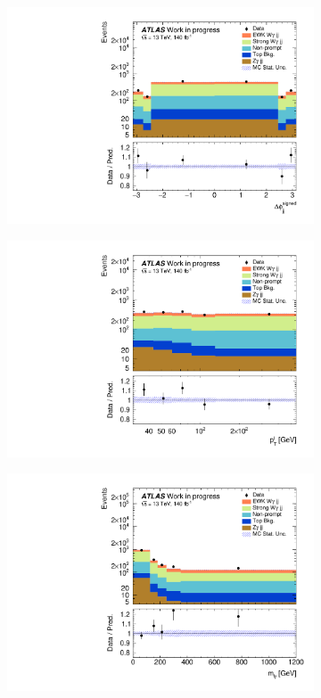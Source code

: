 \begin{figure}[htpb]
\begin{subfigure}[b]{0.48\textwidth}
    \includegraphics[width=\textwidth]{plots/diffx/combined_stacks/data_vs_mc_jj_dphi.pdf}
    \caption{}
\end{subfigure}
\hfill
\begin{subfigure}[b]{0.48\textwidth}
    \centering
    \includegraphics[width=\textwidth]{plots/diffx/combined_stacks/data_vs_mc_lep_pt.pdf}
    \caption{}
\end{subfigure}
\begin{subfigure}[b]{0.48\textwidth}
    \centering
    \includegraphics[width=\textwidth]{plots/diffx/combined_stacks/data_vs_mc_ly_m.pdf}

\end{subfigure}
\end{figure}
